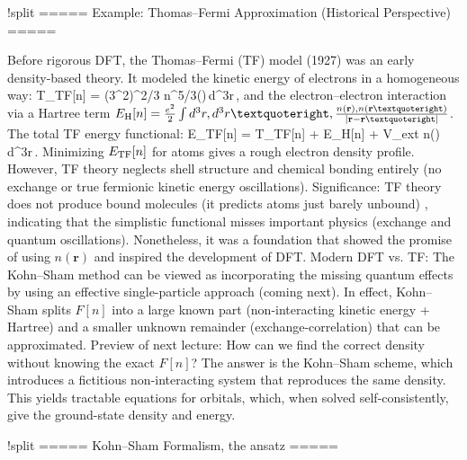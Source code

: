!split
===== Example: Thomas–Fermi Approximation (Historical Perspective) =====

Before rigorous DFT, the Thomas–Fermi (TF) model (1927) was an early density-based theory. It modeled the kinetic energy of electrons in a homogeneous way: T_{\rm TF}[n] = (3\pi^2)^{2/3} \int n^{5/3}()\,d^3r\,, and the electron–electron interaction via a Hartree term $E_{\rm H}[n] = \frac{e^2}{2}\int d^3r,d^3r’ ,\frac{n(\mathbf{r}),n(\mathbf{r}’)}{|\mathbf{r}-\mathbf{r}’|}$. The total TF energy functional: E_{\rm TF}[n] = T_{\rm TF}[n] + E_{\rm H}[n] + \int V_{\rm ext} n()\,d^3r\,. Minimizing $E_{\rm TF}[n]$ for atoms gives a rough electron density profile. However, TF theory neglects shell structure and chemical bonding entirely (no exchange or true fermionic kinetic energy oscillations).
Significance: TF theory does not produce bound molecules (it predicts atoms just barely unbound) , indicating that the simplistic functional misses important physics (exchange and quantum oscillations). Nonetheless, it was a foundation that showed the promise of using $n(\mathbf{r})$ and inspired the development of DFT.
Modern DFT vs. TF: The Kohn–Sham method can be viewed as incorporating the missing quantum effects by using an effective single-particle approach (coming next). In effect, Kohn–Sham splits $F[n]$ into a large known part (non-interacting kinetic energy + Hartree) and a smaller unknown remainder (exchange-correlation) that can be approximated.
Preview of next lecture: How can we find the correct density without knowing the exact $F[n]$? The answer is the Kohn–Sham scheme, which introduces a fictitious non-interacting system that reproduces the same density. This yields tractable equations for orbitals, which, when solved self-consistently, give the ground-state density and energy.

!split
===== Kohn–Sham Formalism, the ansatz =====


